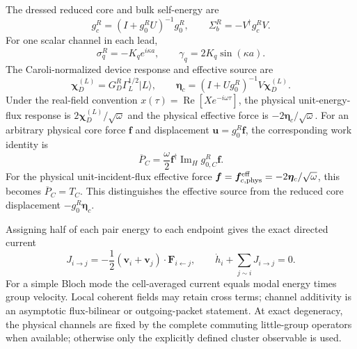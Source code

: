 \documentclass[10pt,aps,pre,onecolumn,notitlepage,nofootinbib]{revtex4-2}
\newcommand{\vu}{\bm u}
\newcommand{\vf}{\bm f}
\newcommand{\veta}{\bm\eta}
\newcommand{\vchi}{\bm\chi}
\newcommand{\ImH}{\operatorname{Im}_{\!H}}
\begin{document}
The dressed reduced core and bulk self-energy are
\begin{equation}
 g_c^R=(I+g_0^RU)^{-1}g_0^R,
 \qquad
 \Sigma_b^R=-V^{\dagger}g_c^RV.
\end{equation}
For one scalar channel in each lead,
\begin{equation}
 \sigma_q^R=-K_qe^{i\kappa a},
 \qquad \gamma_q=2K_q\sin(\kappa a).
\end{equation}
The Caroli-normalized device response and effective source are
\begin{equation}
 \vchi_D^{(L)}=G_D^R\Gamma_L^{1/2}|L\rangle,
 \qquad
 \veta_c=(I+Ug_0^R)^{-1}V\vchi_D^{(L)}.
\end{equation}
Under the real-field convention $x(\tau)=\operatorname{Re}[Xe^{-i\omega\tau}]$, the physical unit-energy-flux response is $2\vchi_D^{(L)}/\sqrt\omega$ and the physical effective force is $-2\veta_c/\sqrt\omega$.  For an arbitrary physical core force $\vf$ and displacement $\vu=g_0^R\vf$, the corresponding work identity is
\begin{equation}
 \overline P_C=\frac{\omega}{2}\vf^{\dagger}\ImH g_{0,C}^R\vf.
\end{equation}
For the physical unit-incident-flux effective force $\vf=\vf_{c,{\rm phys}}^{\rm eff}=-2\veta_c/\sqrt\omega$, this becomes $\overline P_C=T_C$. This distinguishes the effective source from the reduced core displacement $-g_0^R\veta_c$.

Assigning half of each pair energy to each endpoint gives the exact directed current
\begin{equation}
 J_{i\to j}=-\frac12(\bm v_i+\bm v_j)\cdot\bm F_{i\leftarrow j},
 \qquad
 \dot h_i+\sum_{j\sim i}J_{i\to j}=0.
\end{equation}
For a simple Bloch mode the cell-averaged current equals modal energy times group velocity.  Local coherent fields may retain cross terms; channel additivity is an asymptotic flux-bilinear or outgoing-packet statement.  At exact degeneracy, the physical channels are fixed by the complete commuting little-group operators when available; otherwise only the explicitly defined cluster observable is used.
\end{document}
